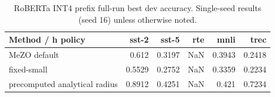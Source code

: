 \begin{table}[t]
\centering
\begin{tabular}{lrrrrr}
\toprule
Method / h policy & sst-2 & sst-5 & rte & mnli & trec \\
\midrule
MeZO default & 0.612 & 0.3197 & NaN & 0.3943 & 0.2418 \\
fixed-small & 0.5529 & 0.2752 & NaN & 0.3359 & 0.2234 \\
precomputed analytical radius & 0.8912 & 0.4251 & NaN & 0.421 & 0.7234 \\
\bottomrule
\end{tabular}

\caption{RoBERTa INT4 prefix full-run best dev accuracy. Single-seed results (seed 16) unless otherwise noted.}
\label{tab:roberta_int4_prefix}
\end{table}

